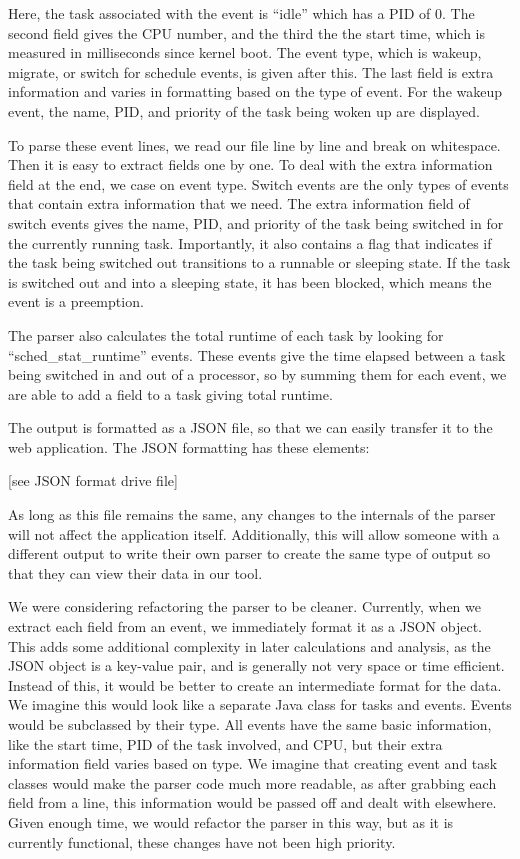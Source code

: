 \documentclass{hmcclinic}
\begin{document}
  Here, the task associated with the event is ``idle'' which has a PID of 0. The
  second field gives the CPU number, and the third the the start time, which
  is measured in milliseconds since kernel boot. The event type, which is 
  wakeup, migrate, or switch for schedule events, is given after this. The last
  field is extra information and varies in formatting based on the type of
  event. For the wakeup event, the name, PID, and priority of the task
  being woken up are displayed.

  To parse these event lines, we read our file line by line and break on
  whitespace. Then it is easy to extract fields one by one. To deal with the
  extra information field at the end, we case on event type. Switch events
  are the only types of events that contain extra information that we need.  The
  extra information field of switch events gives the name, PID, and priority of
  the task being switched in for the currently running task. Importantly, it
  also contains a flag that indicates if the task being switched out transitions
  to a runnable or sleeping state. If the task is switched out and into a
  sleeping state, it has been blocked, which means the event is a preemption.

  The parser also calculates the total runtime of each task by looking for
  ``sched\_stat\_runtime'' events. These events give the time elapsed between
  a task being switched in and out of a processor, so by summing them for 
  each event, we are able to add a field to a task giving total runtime.

  The output is formatted as a JSON file, so that we can easily transfer it to
  the web application. The JSON formatting has these elements:

  [see JSON format drive file]

  As long as this file remains the same, any changes to the internals of the
  parser will not affect the application itself. Additionally, this will allow
  someone with a different output to write their own parser to create the same
  type of output so that they can view their data in our tool.

  We were considering refactoring the parser to be cleaner. Currently, when we
  extract each field from an event, we immediately format it as a JSON object.
  This adds some additional complexity in later calculations and analysis, as
  the JSON object is a key-value pair, and is generally not very space or time
  efficient. Instead of this, it would be better to create an intermediate
  format for the data. We imagine this would look like a separate Java class for
  tasks and events. Events would be subclassed by their type. All events have
  the same basic information, like the start time, PID of the task involved, and
  CPU, but their extra information field varies based on type. We imagine that
  creating event and task classes would make the parser code much more readable,
  as after grabbing each field from a line, this information would be passed off
  and dealt with elsewhere. Given enough time, we would refactor the parser in
  this way, but as it is currently functional, these changes have not been high
  priority.
\end{document}

